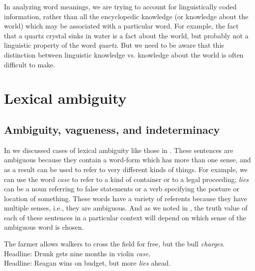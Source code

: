 In analyzing word meanings, we are trying to account for linguistically coded information, rather than all the encyclopedic knowledge (or knowledge about the world) which may be associated with a particular word. For example, the fact that a quartz crystal sinks in water is a fact about the world, but probably not a linguistic property of the word \textit{quartz}. But we need to be aware that this distinction between linguistic knowledge vs. knowledge about the world is often difficult to make.


\section{Lexical ambiguity}\label{sec:} %
\subsection{Ambiguity, vagueness, and indeterminacy}\label{sec:} %

In  we discussed cases of lexical ambiguity like those in . These sentences are ambiguous because they contain a word-form which has more than one sense, and as a result can be used to refer to very different kinds of things. For example, we can use the word \textit{case} to refer to a kind of container or to a legal proceeding; \textit{lies} can be a noun referring to false statements or a verb specifying the posture or location of something. These words have a variety of referents because they have multiple senses, i.e., they are ambiguous. And as we noted in , the truth value of each of these sentences in a particular context will depend on which sense of the ambiguous word is chosen.


\ea \label{ex:5.2}
\ea The farmer allows walkers to cross the field for free, but the bull \textit{charges}.\\
\ex Headline: Drunk gets nine months in violin \textit{case}.\\
\ex Headline: Reagan wins on budget, but more \textit{lies} ahead.
                       \z
\z


